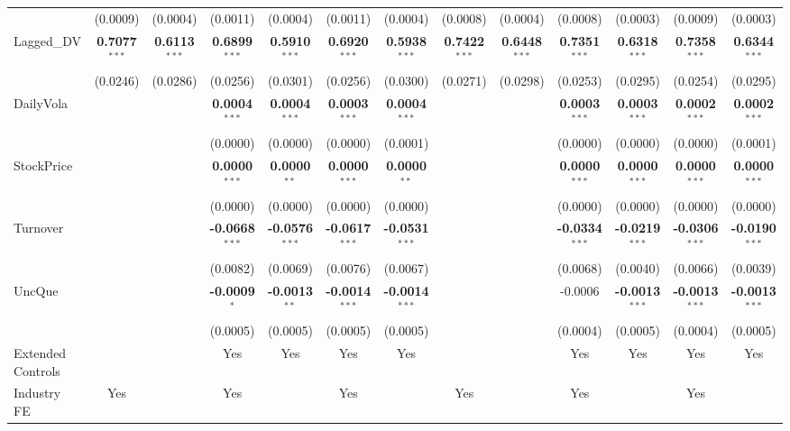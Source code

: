 \begin{landscape}
\begin{table}[H]
\begin{tabular}{lcccccccccccc}
 & (0.0009) & (0.0004) & (0.0011) & (0.0004) & (0.0011) & (0.0004) & (0.0008) & (0.0004) & (0.0008) & (0.0003) & (0.0009) & (0.0003) \\
Lagged\_DV & \textbf{0.7077}$^{***}$ & \textbf{0.6113}$^{***}$ & \textbf{0.6899}$^{***}$ & \textbf{0.5910}$^{***}$ & \textbf{0.6920}$^{***}$ & \textbf{0.5938}$^{***}$ & \textbf{0.7422}$^{***}$ & \textbf{0.6448}$^{***}$ & \textbf{0.7351}$^{***}$ & \textbf{0.6318}$^{***}$ & \textbf{0.7358}$^{***}$ & \textbf{0.6344}$^{***}$ \\
 & (0.0246) & (0.0286) & (0.0256) & (0.0301) & (0.0256) & (0.0300) & (0.0271) & (0.0298) & (0.0253) & (0.0295) & (0.0254) & (0.0295) \\
DailyVola &  &  & \textbf{0.0004}$^{***}$ & \textbf{0.0004}$^{***}$ & \textbf{0.0003}$^{***}$ & \textbf{0.0004}$^{***}$ &  &  & \textbf{0.0003}$^{***}$ & \textbf{0.0003}$^{***}$ & \textbf{0.0002}$^{***}$ & \textbf{0.0002}$^{***}$ \\
 &  &  & (0.0000) & (0.0000) & (0.0000) & (0.0001) &  &  & (0.0000) & (0.0000) & (0.0000) & (0.0001) \\
StockPrice &  &  & \textbf{0.0000}$^{***}$ & \textbf{0.0000}$^{**}$ & \textbf{0.0000}$^{***}$ & \textbf{0.0000}$^{**}$ &  &  & \textbf{0.0000}$^{***}$ & \textbf{0.0000}$^{***}$ & \textbf{0.0000}$^{***}$ & \textbf{0.0000}$^{***}$ \\
 &  &  & (0.0000) & (0.0000) & (0.0000) & (0.0000) &  &  & (0.0000) & (0.0000) & (0.0000) & (0.0000) \\
Turnover &  &  & \textbf{-0.0668}$^{***}$ & \textbf{-0.0576}$^{***}$ & \textbf{-0.0617}$^{***}$ & \textbf{-0.0531}$^{***}$ &  &  & \textbf{-0.0334}$^{***}$ & \textbf{-0.0219}$^{***}$ & \textbf{-0.0306}$^{***}$ & \textbf{-0.0190}$^{***}$ \\
 &  &  & (0.0082) & (0.0069) & (0.0076) & (0.0067) &  &  & (0.0068) & (0.0040) & (0.0066) & (0.0039) \\
UncQue &  &  & \textbf{-0.0009}$^{*}$ & \textbf{-0.0013}$^{**}$ & \textbf{-0.0014}$^{***}$ & \textbf{-0.0014}$^{***}$ &  &  & -0.0006 & \textbf{-0.0013}$^{***}$ & \textbf{-0.0013}$^{***}$ & \textbf{-0.0013}$^{***}$ \\
 &  &  & (0.0005) & (0.0005) & (0.0005) & (0.0005) &  &  & (0.0004) & (0.0005) & (0.0004) & (0.0005) \\
\midrule
Extended Controls &  &  & Yes & Yes & Yes & Yes &  &  & Yes & Yes & Yes & Yes \\
Industry FE & Yes &  & Yes &  & Yes &  & Yes &  & Yes &  & Yes &  \\

\end{tabular}
\end{table}
\end{landscape}
